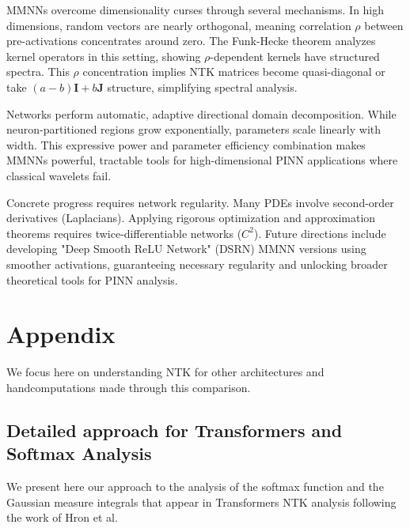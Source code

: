 \documentclass[a4paper]{article}
\theoremstyle{plain}
\theoremstyle{definition}
\theoremstyle{remark}
\begin{document}
\begin{tcolorbox}[colback=green!5,colframe=green!80!black,title={\textbf{Remark: High-Dimensional Advantages}},enhanced,drop shadow,boxrule=2pt]
MMNNs overcome dimensionality curses through several mechanisms. In high dimensions, random vectors are nearly orthogonal, meaning correlation $\rho$ between pre-activations concentrates around zero. The Funk-Hecke theorem analyzes kernel operators in this setting, showing $\rho$-dependent kernels have structured spectra. This $\rho$ concentration implies NTK matrices become quasi-diagonal or take $(a-b)\mathbf{I} + b\mathbf{J}$ structure, simplifying spectral analysis.
\end{tcolorbox}

Networks perform automatic, adaptive directional domain decomposition. While neuron-partitioned regions grow exponentially, parameters scale linearly with width. This expressive power and parameter efficiency combination makes MMNNs powerful, tractable tools for high-dimensional PINN applications where classical wavelets fail.

Concrete progress requires network regularity. Many PDEs involve second-order derivatives (Laplacians). Applying rigorous optimization and approximation theorems requires twice-differentiable networks ($C^2$). Future directions include developing "Deep Smooth ReLU Network" (DSRN) MMNN versions using smoother activations, guaranteeing necessary regularity and unlocking broader theoretical tools for PINN analysis.











\newpage

\appendix
\section{Appendix}


We focus here on understanding NTK for other architectures and handcomputations made through this comparison.


\subsection{Detailed approach for Transformers and Softmax Analysis}
\label{app:transformers}

We present here our approach to the analysis of the softmax function and the Gaussian measure integrals that appear in Transformers NTK analysis following the work of Hron et al.
\end{document}
